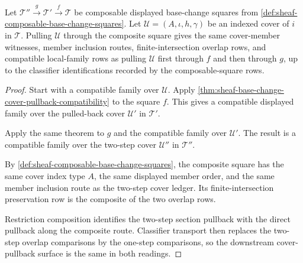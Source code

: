\begin{theorem}
\label{thm:sheaf-base-change-cover-pullback-composition}
Let $\mathcal{T}''\xrightarrow{g}\mathcal{T}'\xrightarrow{f}\mathcal{T}$ be composable displayed base-change squares from \autoref{def:sheaf-composable-base-change-squares}. Let $\mathcal{U}=(A,\iota,h,\gamma)$ be an indexed cover of $i$ in $\mathcal{T}$. Pulling $\mathcal{U}$ through the composite square gives the same cover-member witnesses, member inclusion routes, finite-intersection overlap rows, and compatible local-family rows as pulling $\mathcal{U}$ first through $f$ and then through $g$, up to the classifier identifications recorded by the composable-square rows.
\end{theorem}
\begin{proof}
Start with a compatible family over $\mathcal{U}$. Apply \autoref{thm:sheaf-base-change-cover-pullback-compatibility} to the square $f$. This gives a compatible displayed family over the pulled-back cover $\mathcal{U}'$ in $\mathcal{T}'$.

Apply the same theorem to $g$ and the compatible family over $\mathcal{U}'$. The result is a compatible family over the two-step cover $\mathcal{U}''$ in $\mathcal{T}''$.

By \autoref{def:sheaf-composable-base-change-squares}, the composite square has the same cover index type $A$, the same displayed member order, and the same member inclusion route as the two-step cover ledger. Its finite-intersection preservation row is the composite of the two overlap rows.

Restriction composition identifies the two-step section pullback with the direct pullback along the composite route. Classifier transport then replaces the two-step overlap comparisons by the one-step comparisons, so the downstream cover-pullback surface is the same in both readings.
\end{proof}

